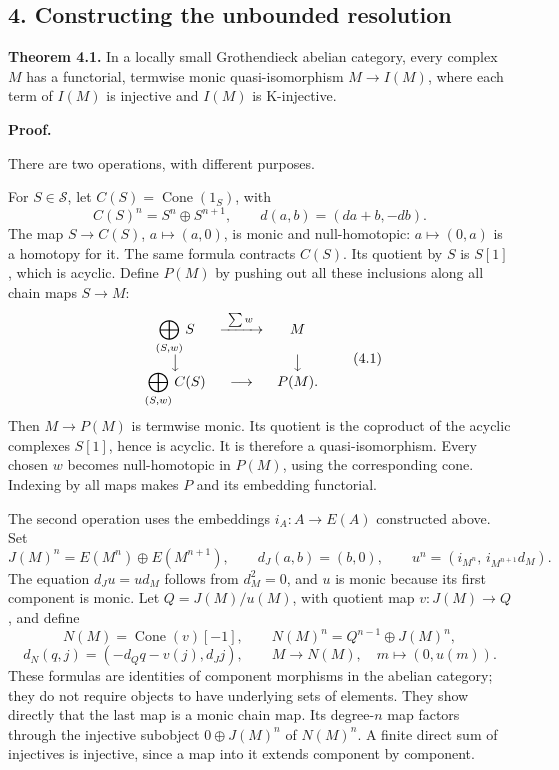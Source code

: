 \documentclass[
  english,
  11pt,
  a4paper,
]{article}
\begin{document}
\subsection{4. Constructing the unbounded
resolution}\label{k-injective-resolutions-in-grothendieck-categories--4-constructing-the-unbounded-resolution}

\textbf{Theorem 4.1.} In a locally small Grothendieck abelian category,
every complex \(M\) has a functorial, termwise monic quasi-isomorphism
\(M\to I(M)\), where each term of \(I(M)\) is injective and \(I(M)\) is
K-injective.

\textbf{Proof.}

There are two operations, with different purposes.

For \(S\in\mathscr S\), let \(C(S)=\operatorname{Cone}(1_S)\), with
\[C(S)^n=S^n\oplus S^{n+1},\qquad
d(a,b)=(da+b,-db).\] The map \(S\to C(S)\), \(a\mapsto(a,0)\), is monic
and null-homotopic: \(a\mapsto(0,a)\) is a homotopy for it. The same
formula contracts \(C(S)\). Its quotient by \(S\) is \(S[1]\), which is
acyclic. Define \(P(M)\) by pushing out all these inclusions along all
chain maps \(S\to M\): \[\begin{array}{ccc}
\displaystyle\bigoplus_{(S,w)}S&\xrightarrow{\ \sum w\ }&M\\
\big\downarrow&&\big\downarrow\\
\displaystyle\bigoplus_{(S,w)}C(S)&\longrightarrow&P(M).
\end{array}
\tag{4.1}\] Then \(M\to P(M)\) is termwise monic. Its quotient is the
coproduct of the acyclic complexes \(S[1]\), hence is acyclic. It is
therefore a quasi-isomorphism. Every chosen \(w\) becomes null-homotopic
in \(P(M)\), using the corresponding cone. Indexing by all maps makes
\(P\) and its embedding functorial.

The second operation uses the embeddings \(i_A:A\to E(A)\) constructed
above. Set \[J(M)^n=E(M^n)\oplus E(M^{n+1}),\qquad
d_J(a,b)=(b,0),\qquad
u^n=(i_{M^n},\,i_{M^{n+1}}d_M).
\tag{4.2}\] The equation \(d_Ju=ud_M\) follows from \(d_M^2=0\), and
\(u\) is monic because its first component is monic. Let
\(Q=J(M)/u(M)\), with quotient map \(v:J(M)\to Q\), and define
\[N(M)=\operatorname{Cone}(v)[-1],\qquad
N(M)^n=Q^{n-1}\oplus J(M)^n,\] \[d_N(q,j)=(-d_Qq-v(j),d_Jj),\qquad
M\longrightarrow N(M),\quad m\longmapsto(0,u(m)).
\tag{4.3}\] These formulas are identities of component morphisms in the
abelian category; they do not require objects to have underlying sets of
elements. They show directly that the last map is a monic chain map. Its
degree-\(n\) map factors through the injective subobject
\(0\oplus J(M)^n\) of \(N(M)^n\). A finite direct sum of injectives is
injective, since a map into it extends component by component.
\end{document}
